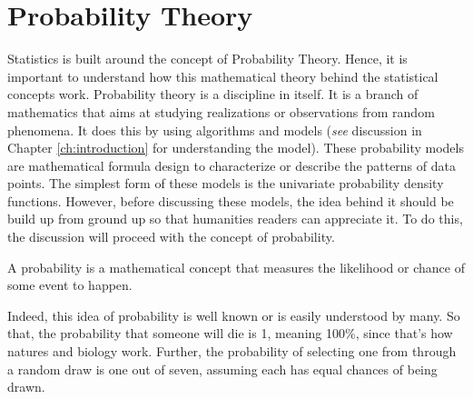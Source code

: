 \section{Probability Theory}\label{sec:probability_method}
Statistics is built around the concept of Probability Theory. Hence, it is important to understand how this mathematical theory behind the statistical concepts work. Probability theory is a discipline in itself. It is a branch of mathematics that aims at studying realizations or observations from random phenomena. It does this by using algorithms and models (\textit{see} discussion in Chapter \ref{ch:introduction} for understanding the model). These probability models are mathematical formula design to characterize or describe the patterns of data points. The simplest form of these models is the univariate probability density functions. However, before discussing these models, the idea behind it should be build up from ground up so that humanities readers can appreciate it. To do this, the discussion will proceed with the concept of probability.
\begin{defnx}[Probability]\label{defn:probability}
A probability is a mathematical concept that measures the likelihood or chance of some event to happen.
\end{defnx}
Indeed, this idea of probability is well known or is easily understood by many. So that, the probability that someone will die is 1, meaning 100\%, since that's how natures and biology work. Further, the probability of selecting one   from   through a random draw is one out of seven, assuming each   has equal chances of being drawn.

